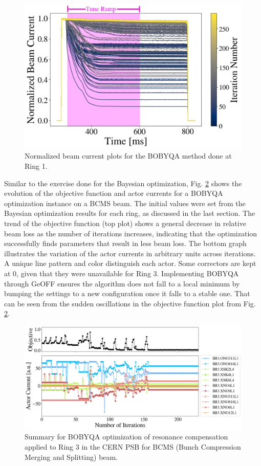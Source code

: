 \begin{figure}[H]
    \centering
    \includegraphics[width=\linewidth]{chapter5/i2_bobyqa_commented.png}
    \caption{Normalized beam current plots for the BOBYQA method done at Ring 1.}
    \label{fig:ibobyqa}
\end{figure}

Similar to the exercise done for the Bayesian optimization, Fig. \ref{fig:bobyqa1} shows the evolution of the objective function and actor currents for a BOBYQA optimization instance on a BCMS beam. The initial values were set from the Bayesian optimization results for each ring, as discussed in the last section. The trend of the objective function (top plot) shows a general decrease in relative beam loss as the number of iterations increases, indicating that the optimization successfully finds parameters that result in less beam loss. The bottom graph illustrates the variation of the actor currents in arbitrary units across iterations. A unique line pattern and color distinguish each actor. Some correctors are kept at 0, given that they were unavailable for Ring 3. Implementing BOBYQA through GeOFF ensures the algorithm does not fall to a local minimum by bumping the settings to a new configuration once it falls to a stable one. That can be seen from the sudden oscillations in the objective function plot from Fig. \ref{fig:bobyqa1}.  

\begin{figure}[H]
    \centering
    \includegraphics[width=\linewidth]{chapter5/2023_05_04_R3_BCMS_bobyqa.png}
    \caption{Summary for BOBYQA optimization of resonance compensation applied to Ring 3 in the CERN PSB for BCMS (Bunch Compression Merging and Splitting) beam.}
    \label{fig:bobyqa1}
\end{figure}

